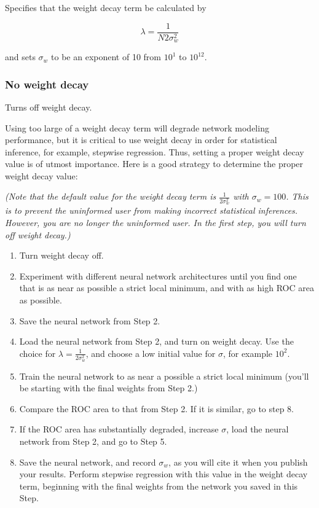 Specifies that the weight decay term be calculated by

\begin{displaymath}
\lambda = \frac 1{N2\sigma_w^2}
\end{displaymath}

and sets $\sigma_w$ to be an exponent of 10 from $10^1$ to $10^{12}$.

\subsubsection{No weight decay}

Turns off weight decay.

\vspace{9 pt}{\bf \large \beginred READ THIS! \endcolor}

Using too large of a weight decay term will degrade network modeling
performance, but it is critical to use weight decay in order for
statistical inference, for example, stepwise regression.  Thus,
setting a proper weight decay value is of utmost importance.  Here is
a good strategy to determine the proper weight decay value:

{\em (Note that the default value for the weight decay term is
$\frac 1{2\sigma_w^2}$ with $\sigma_w = 100$.  This is to prevent the
uninformed user from making incorrect statistical inferences.
However, you are no longer the uninformed user. In the first step, you
will turn off weight decay.)}

\begin{enumerate}

\item Turn weight decay off.

\item Experiment with different neural network architectures until you
find one that is as near as possible a strict local minimum, and with
as high ROC area as possible.

\item Save the neural network from Step 2.

\item Load the neural network from Step 2, and turn on weight decay.
Use the choice for $\lambda = \frac 1{2\sigma_w^2}$, and choose a low
initial value for $\sigma$, for example $10^2$.

\item Train the neural network to as near a possible a strict local
minimum (you'll be starting with the final weights from Step 2.)

\item Compare the ROC area to that from Step 2.  If it is similar, go
to step 8.

\item If the ROC area has substantially degraded, increase $\sigma$,
load the neural network from Step 2, and go to Step 5.

\item Save the neural network, and record $\sigma_w$, as you will cite
it when you publish your results. Perform stepwise regression with
this value in the weight decay term, beginning with the final weights
from the network you saved in this Step.

\end{enumerate}

